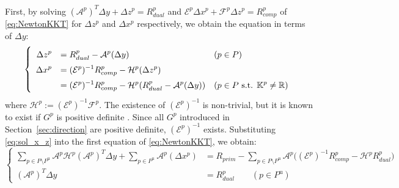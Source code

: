 First, by solving $(\mathcal{A}^p)^T \Delta y + \Delta z^p = R_{dual}^p$ and $\mathcal{E}^p \Delta x^p + \mathcal{F}^p \Delta z^p = R_{comp}^p$ of \eqref{eq:NewtonKKT} for $\Delta z^p$ and $\Delta x^p$ respectively, we obtain the equation in terms of $\Delta y$:
\begin{equation}
    \everymath{\displaystyle}
    \renewcommand{\arraystretch}{1.5}
    \left\{
    \begin{array}{rll}
    \Delta z^p &= R_{dual}^p - \mathcal{A}^p(\Delta y)  & (p\in P)\\
    \Delta x^p &= (\mathcal{E}^p)^{-1}R_{comp}^p - \mathcal{H}^p(\Delta z^p) \\
               &= (\mathcal{E}^p)^{-1}R_{comp}^p - \mathcal{H}^p(R_{dual}^p - \mathcal{A}^p(\Delta y))  & (p\in P \text{ s.t. } \mathbb{K}^p \neq \mathbb{R})
   \end{array}
   \right.
   \label{eq:sol_x_z}
\end{equation}
where $\mathcal{H}^p := (\mathcal{E}^p)^{-1}\mathcal{F}^p$. 
The existence of $(\mathcal{E}^p)^{-1}$ is non-trivial, but it is known to exist if $G^p$ is positive definite \cite{todd1998}. 
Since all $G^p$ introduced in Section~\ref{sec:direction} are positive definite, $(\mathcal{E}^p)^{-1}$ exists.
Substituting \eqref{eq:sol_x_z} into the first equation of \eqref{eq:NewtonKKT}, we obtain:
\begin{equation}
    \left\{
    \begin{aligned}
        \sum_{p \in P\setminus P^{\text{u}}} \mathcal{A}^p\mathcal{H}^p(\mathcal{A}^p)^T\Delta y + \sum_{p \in P^{\text{u}}} \mathcal{A}^p(\Delta x^p) 
            &= R_{prim} - \sum_{p \in P\setminus P^{\text{u}}} \mathcal{A}^p \big( (\mathcal{E}^p)^{-1}R_{comp}^p - \mathcal{H}^p R_{dual}^p \big) \\
        (\mathcal{A}^p)^T \Delta y 
            &= R^p_{dual} \qquad (p\in P^{\text{u}})
    \end{aligned}
    \right.
    \label{eq:Schur_complement}
\end{equation}

